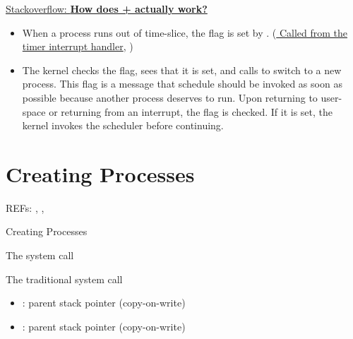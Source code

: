 \href{http://stackoverflow.com/questions/6525905/how-does-scheduleswitch-to-functions-from-linux-kernel-actually-work}{Stackoverflow:
  \textbf{How does  +  actually work?}}
\begin{itemize}
\item When a process runs out of time-slice, the flag  is set by
  . (\href{http://cs3.swfu.edu.cn/linux-source/HTML/S/2514.html#L813}{
    Called from the timer interrupt handler}, )
\item The kernel checks the flag, sees that it is set, and calls  to
  switch to a new process. This flag is a message that schedule should be invoked as soon
  as possible because another process deserves to run. Upon returning to user-space or
  returning from an interrupt, the  flag is checked. If it is
  set, the kernel invokes the scheduler before continuing.
\end{itemize}

  
\section{Creating Processes}
\label{sec:creating-processes}

REFs: \cite{mauerer2008professional}, \cite{rodriguez2005linux}, \cite{love2010linux}

\begin{frame}{Creating Processes}
  \begin{block}{The  system call}
    \begin{center}
    \end{center}
  \end{block}
  \begin{block}{The traditional  system call}
    \begin{itemize}
    \item {}: parent stack pointer (copy-on-write)
    \end{itemize}
  \end{block}
  \begin{block}{}
    \mbox{{\small {}}}
    \begin{itemize}
    \item {}: parent stack pointer (copy-on-write)
    \end{itemize}
  \end{block}
\end{frame}

